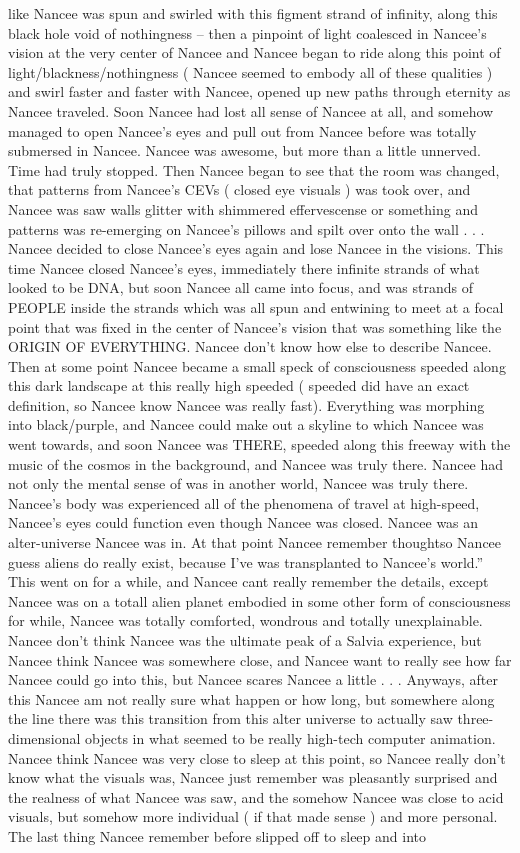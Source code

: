 \documentclass[12pt]{book}
\begin{document}
like Nancee was spun and swirled with this figment strand of infinity, along this black hole void of nothingness -- then a pinpoint of light coalesced in Nancee's vision at the very center of Nancee and Nancee began to ride along this point of light/blackness/nothingness ( Nancee seemed to embody all of these qualities ) and swirl faster and faster with Nancee, opened up new paths through eternity as Nancee traveled. Soon Nancee had lost all sense of Nancee at all, and somehow managed to open Nancee's eyes and pull out from Nancee before was totally submersed in Nancee. Nancee was awesome, but more than a little unnerved. Time had truly stopped. Then Nancee began to see that the room was changed, that patterns from Nancee's CEVs ( closed eye visuals ) was took over, and Nancee was saw walls glitter with shimmered effervescense or something and patterns was re-emerging on Nancee's pillows and spilt over onto the wall . . .  Nancee decided to close Nancee's eyes again and lose Nancee in the visions. This time Nancee closed Nancee's eyes, immediately there infinite strands of what looked to be DNA, but soon Nancee all came into focus, and was strands of PEOPLE inside the strands which was all spun and entwining to meet at a focal point that was fixed in the center of Nancee's vision that was something like the ORIGIN OF EVERYTHING. Nancee don't know how else to describe Nancee. Then at some point Nancee became a small speck of consciousness speeded along this dark landscape at this really high speeded ( speeded did have an exact definition, so Nancee know Nancee was really fast). Everything was morphing into black/purple, and Nancee could make out a skyline to which Nancee was went towards, and soon Nancee was THERE, speeded along this freeway with the music of the cosmos in the background, and Nancee was truly there. Nancee had not only the mental sense of was in another world, Nancee was truly there. Nancee's body was experienced all of the phenomena of travel at high-speed, Nancee's eyes could function even though Nancee was closed. Nancee was an alter-universe Nancee was in. At that point Nancee remember thoughtso Nancee guess aliens do really exist, because I've was transplanted to Nancee's world.'' This went on for a while, and Nancee cant really remember the details, except Nancee was on a totall alien planet embodied in some other form of consciousness for while, Nancee was totally comforted, wondrous and totally unexplainable. Nancee don't think Nancee was the ultimate peak of a Salvia experience, but Nancee think Nancee was somewhere close, and Nancee want to really see how far Nancee could go into this, but Nancee scares Nancee a little . . .  Anyways, after this Nancee am not really sure what happen or how long, but somewhere along the line there was this transition from this alter universe to actually saw three-dimensional objects in what seemed to be really high-tech computer animation. Nancee think Nancee was very close to sleep at this point, so Nancee really don't know what the visuals was, Nancee just remember was pleasantly surprised and the realness of what Nancee was saw, and the somehow Nancee was close to acid visuals, but somehow more individual ( if that made sense ) and more personal. The last thing Nancee remember before slipped off to sleep and into 
\end{document}
